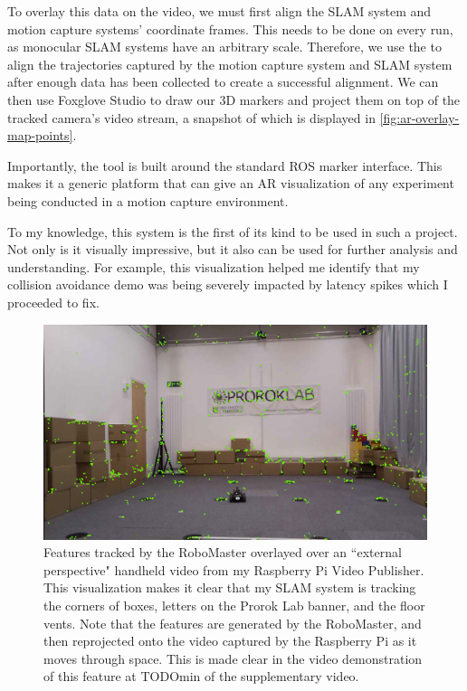 To overlay this data on the video, we must first align the SLAM system and motion capture systems' coordinate frames. This needs to be done on every run, as monocular SLAM systems have an arbitrary scale. Therefore, we use the  to align the trajectories captured by the motion capture system and SLAM system after enough data has been collected to create a successful alignment. We can then use Foxglove Studio to draw our 3D markers and project them on top of the tracked camera's video stream, a snapshot of which is displayed in \autoref{fig:ar-overlay-map-points}.

Importantly, the tool is built around the standard ROS marker interface. This makes it a generic platform that can give an AR visualization of any experiment being conducted in a motion capture environment.

To my knowledge, this system is the first of its kind to be used in such a project. Not only is it visually impressive, but it also can be used for further analysis and understanding. For example, this visualization helped me identify that my collision avoidance demo was being severely impacted by latency spikes which I proceeded to fix.

\begin{figure}[h]
    \centering
    \includegraphics[width=0.8\linewidth]{figures/ar_overlay_map_points.png}

    \caption{Features tracked by the RoboMaster overlayed over an ``external perspective" handheld video from my Raspberry Pi Video Publisher. This visualization makes it clear that my SLAM system is tracking the corners of boxes, letters on the Prorok Lab banner, and the floor vents. \captionbreak Note that the features are generated by the RoboMaster, and then reprojected onto the video captured by the Raspberry Pi as it moves through space. This is made clear in the video demonstration of this feature at TODOmin of the supplementary video\protect\footnotemark[1].}
    \label{fig:ar-overlay-map-points}
\end{figure}


